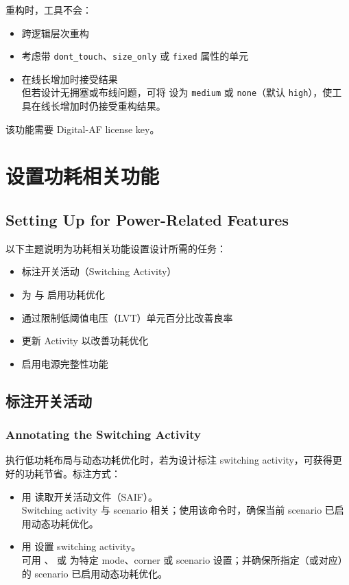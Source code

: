 重构时，工具不会：
\begin{itemize}
  \item 跨逻辑层次重构
  \item 考虑带 \texttt{dont\_touch}、\texttt{size\_only} 或 \texttt{fixed} 属性的单元
  \item 在线长增加时接受结果\\
        但若设计无拥塞或布线问题，可将  设为 \texttt{medium} 或 \texttt{none}（默认 \texttt{high}），使工具在线长增加时仍接受重构结果。
\end{itemize}

\begin{noteBox}
该功能需要 Digital-AF license key。
\end{noteBox}

\section{设置功耗相关功能}
\subsection*{Setting Up for Power-Related Features}

以下主题说明为功耗相关功能设置设计所需的任务：
\begin{itemize}
  \item 标注开关活动（Switching Activity）
  \item 为  与  启用功耗优化
  \item 通过限制低阈值电压（LVT）单元百分比改善良率
  \item 更新 Activity 以改善功耗优化
  \item 启用电源完整性功能
\end{itemize}

\subsection{标注开关活动}
\subsubsection*{Annotating the Switching Activity}

执行低功耗布局与动态功耗优化时，若为设计标注 switching activity，可获得更好的功耗节省。标注方式：
\begin{itemize}
  \item 用  读取开关活动文件（SAIF）。\\
        Switching activity 与 scenario 相关；使用该命令时，确保当前 scenario 已启用动态功耗优化。
  \item 用  设置 switching activity。\\
        可用 、 或  为特定 mode、corner 或 scenario 设置；并确保所指定（或对应）的 scenario 已启用动态功耗优化。
\end{itemize}

